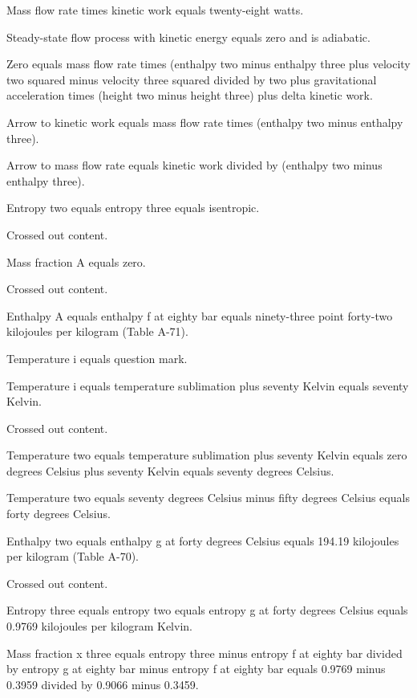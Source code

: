 Mass flow rate times kinetic work equals twenty-eight watts.

Steady-state flow process with kinetic energy equals zero and is adiabatic.

Zero equals mass flow rate times (enthalpy two minus enthalpy three plus velocity two squared minus velocity three squared divided by two plus gravitational acceleration times (height two minus height three) plus delta kinetic work.

Arrow to kinetic work equals mass flow rate times (enthalpy two minus enthalpy three).

Arrow to mass flow rate equals kinetic work divided by (enthalpy two minus enthalpy three).

Entropy two equals entropy three equals isentropic.

Crossed out content.

Mass fraction A equals zero.

Crossed out content.

Enthalpy A equals enthalpy f at eighty bar equals ninety-three point forty-two kilojoules per kilogram (Table A-71).

Temperature i equals question mark.

Temperature i equals temperature sublimation plus seventy Kelvin equals seventy Kelvin.

Crossed out content.

Temperature two equals temperature sublimation plus seventy Kelvin equals zero degrees Celsius plus seventy Kelvin equals seventy degrees Celsius.

Temperature two equals seventy degrees Celsius minus fifty degrees Celsius equals forty degrees Celsius.

Enthalpy two equals enthalpy g at forty degrees Celsius equals 194.19 kilojoules per kilogram (Table A-70).

Crossed out content.

Entropy three equals entropy two equals entropy g at forty degrees Celsius equals 0.9769 kilojoules per kilogram Kelvin.

Mass fraction x three equals entropy three minus entropy f at eighty bar divided by entropy g at eighty bar minus entropy f at eighty bar equals 0.9769 minus 0.3959 divided by 0.9066 minus 0.3459.